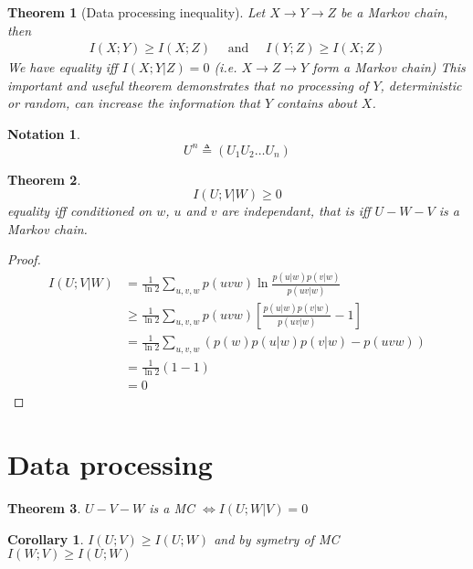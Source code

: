 \documentclass[twoside]{article}
\newtheorem{theorem}{Theorem}[section]
\newtheorem{corollary}{Corollary}[theorem]
\newtheorem{notation}{Notation}
\theoremstyle{definition} %
\begin{document}
\begin{theorem}[Data processing inequality]
  Let $X \rightarrow Y \rightarrow Z$ be a Markov chain, then
  \begin{align*}
    I(X ; Y) \geq I(X ; Z) \quad \text{ and } \quad I(Y ; Z) \geq I(X ; Z)
  \end{align*}
  We have equality iff $I(X ; Y | Z) = 0$ (i.e. $X \rightarrow Z \rightarrow Y$ form a Markov chain)
  This important and useful theorem demonstrates that no processing of $Y$, deterministic or random, can increase the information that $Y$ contains about $X$.
\end{theorem}

\begin{notation}
  \[
    U^n \triangleq (U_1 U_2 \dots U_n)
  \]
\end{notation}

\begin{theorem}
  \[
    I(U;V |W) \geq 0
  \]
  equality iff conditioned on $w$, $u$ and $v$ are independant, that is iff $U-W-V$ is a Markov chain.
\end{theorem}


\begin{proof}
  \begin{align*}
    I(U;V|W) &= \frac 1 {\ln 2} \sum_{u,v,w} p(uvw) \ln \frac {p(u|w)p(v|w)} {p(uv | w)}\\
    &\geq \frac 1 {\ln 2} \sum_{u,v,w} p(uvw) \left[ \frac {p(u|w)p(v|w)} {p(uv | w)} - 1 \right]\\
    &=\frac 1 {\ln 2} \sum_{u,v,w}(p(w)p(u|w)p(v|w) - p(uvw))\\
    &= \frac 1 {\ln 2}(1 - 1) \\
    &=0
  \end{align*}
\end{proof}


\cleardoublepage
\section{Data processing}

\begin{theorem}
  $U-V-W$ is a MC $\iff I(U;W|V) = 0$
\end{theorem}

\begin{corollary}
  $I(U;V) \geq I(U;W)$ and by symetry of MC $I(W;V) \geq I(U;W)$
\end{corollary}
\end{document}
